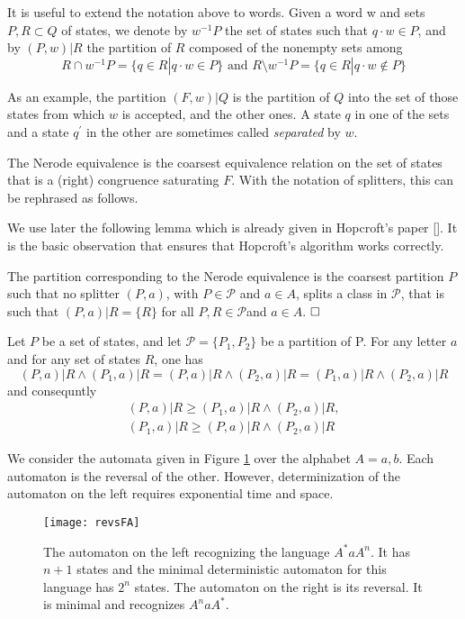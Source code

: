 It is useful to extend the notation above to words. Given a word w and sets $P,R\subset Q$ of states, we denote by $w^{-1}P$ the set of states such that $q\cdot w\in P$, and by $(P,w)|R$ the partition of $R$ composed of the nonempty sets among
\[R\cap w^{-1}P=\{q\in R|q\cdot w\in P \} \text{ and } R\setminus w^{-1}P=\{q\in R |q\cdot w\notin P \} \]

As an example, the partition $(F,w)|Q$ is the partition of $Q$ into the set of those states from which $w$ is accepted, and the other ones. A state $q$ in one of the sets and a state $q^\prime$ in the
other are sometimes called \textit{separated} by $w$.

The Nerode equivalence is the coarsest equivalence relation on the set of states that is a (right) congruence saturating $F$. With the notation of splitters, this can be rephrased as follows.

We use later the following lemma which is already given in Hopcroft’s paper [\cite{Hopcroft71}]. It is the basic observation that ensures that Hopcroft’s algorithm works correctly.

\begin{proposition}
	The partition corresponding to the Nerode equivalence is the coarsest partition $P$ such that no splitter $(P, a)$, with $P \in \mathcal{P}$ and $a\in A$, splits a class in $\mathcal{P}$, that is	such that $(P, a)|R = \{R\}$ for all $P,R\in \mathcal{P} $and $a\in A$. $\hfill\square$
\end{proposition}

\begin{lemma}
	Let $P$ be a set of states, and let $\mathcal{P} = \{P_1, P_2\}$ be a partition of P. For any letter $a$ and for any set of states $R$, one has
	\[(P,a)|R\land (P_1,a)|R=(P,a)|R\land (P_2,a)|R=(P_1,a)|R\land (P_2,a)|R \]
	and consequntly
	\begin{align} 
	(P,a)|R \ge (P_1,a)|R\land (P_2,a)|R,\\
	(P_1,a)|R \ge (P,a)|R\land (P_2,a)|R
	\end{align}
\end{lemma}

\begin{example}
	We consider the automata given in Figure \ref{fig:revsFA} over the alphabet $A = {a, b}$.	Each automaton is the reversal of the other. However, determinization of the automaton
	on the left requires exponential time and space.
	\begin{figure}[htbp]
		\texttt{[image: revsFA]}
		\caption{The automaton on the left recognizing the language $A^\ast aA^n$. It has $n + 1$ states and the minimal deterministic automaton for this language has $2^n$ states. The	automaton on the right is its reversal. It is minimal and recognizes $A^naA^\ast$.}
	    \label{fig:revsFA}
	\end{figure}
\end{example}

